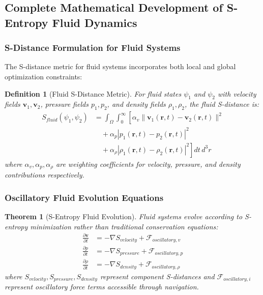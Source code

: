 \documentclass[12pt,a4paper]{article}
\newtheorem{theorem}{Theorem}
\newtheorem{definition}{Definition}
\begin{document}
\subsection{Complete Mathematical Development of S-Entropy Fluid Dynamics}

\subsubsection{S-Distance Formulation for Fluid Systems}

The S-distance metric for fluid systems incorporates both local and global optimization constraints:

\begin{definition}[Fluid S-Distance Metric]
For fluid states $\psi_1$ and $\psi_2$ with velocity fields $\mathbf{v}_1, \mathbf{v}_2$, pressure fields $p_1, p_2$, and density fields $\rho_1, \rho_2$, the fluid S-distance is:
\begin{align}
S_{fluid}(\psi_1, \psi_2) &= \int_{\Omega} \int_0^{\infty} \left[ \alpha_v \|\mathbf{v}_1(\mathbf{r}, t) - \mathbf{v}_2(\mathbf{r}, t)\|^2 \right. \\
&\quad + \alpha_p |p_1(\mathbf{r}, t) - p_2(\mathbf{r}, t)|^2 \\
&\quad + \left. \alpha_\rho |\rho_1(\mathbf{r}, t) - \rho_2(\mathbf{r}, t)|^2 \right] dt \, d^3r
\end{align}
where $\alpha_v, \alpha_p, \alpha_\rho$ are weighting coefficients for velocity, pressure, and density contributions respectively.
\end{definition}

\subsubsection{Oscillatory Fluid Evolution Equations}

\begin{theorem}[S-Entropy Fluid Evolution]
Fluid systems evolve according to S-entropy minimization rather than traditional conservation equations:
\begin{align}
\frac{\partial \mathbf{v}}{\partial t} &= -\nabla S_{velocity} + \mathcal{F}_{oscillatory,v} \\
\frac{\partial p}{\partial t} &= -\nabla S_{pressure} + \mathcal{F}_{oscillatory,p} \\
\frac{\partial \rho}{\partial t} &= -\nabla S_{density} + \mathcal{F}_{oscillatory,\rho}
\end{align}
where $S_{velocity}, S_{pressure}, S_{density}$ represent component S-distances and $\mathcal{F}_{oscillatory,i}$ represent oscillatory force terms accessible through navigation.
\end{theorem}
\end{document}
